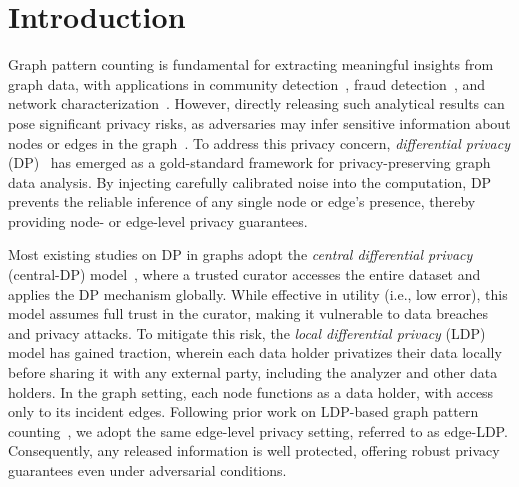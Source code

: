 \section{Introduction}




Graph pattern counting is fundamental for extracting meaningful insights from graph data, with applications in community detection~\cite{palla2005uncovering}, fraud detection~\cite{akoglu2013anomaly}, and network characterization~\cite{milo2002network}.
However, directly releasing such analytical results can pose significant privacy risks, as adversaries may infer sensitive information about nodes or edges in the graph~\cite{narayanan2009anonymizing, wu2021adapting, zhang2022inference}.
To address this privacy concern, \emph{differential privacy} (DP)~\cite{dwork2006calibrating} has emerged as a gold-standard framework for privacy-preserving graph data analysis. 
By injecting carefully calibrated noise into the computation, DP prevents the reliable inference of any single node or edge's presence, thereby providing node- or edge-level privacy guarantees.





Most existing studies on DP in graphs adopt the \emph{central differential privacy} (central-DP) model~\cite{nissim2007smooth,karwa2011private,zhang2015private,dong2023continual}, where a trusted curator accesses the entire dataset and applies the DP mechanism globally.
While effective in utility (i.e., low error), this model assumes full trust in the curator, making it vulnerable to data breaches and privacy attacks. 
To mitigate this risk, the \emph{local differential privacy} (LDP)~\cite{kasiviswanathan2011can,cormode2018privacy} model has gained traction, wherein each data holder privatizes their data locally before sharing it with any external party, including the analyzer and other data holders. 
In the graph setting, each node functions as a data holder, with access only to its incident edges.
Following prior work on LDP-based graph pattern counting~\cite{sun2019analyzing,ye2020towards,ye2020lf,Imola2021,Imola2022,eden2023triangle,he2025robust}, we adopt the same edge-level privacy setting, referred to as edge-LDP.
Consequently, any released information is well protected, offering robust privacy guarantees even under adversarial conditions.


